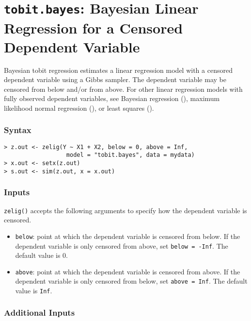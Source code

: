 \section{\texttt{tobit.bayes}: Bayesian Linear Regression for a
Censored Dependent Variable} \label{tobit.bayes}

Bayesian tobit regression estimates a linear regression model with a
censored dependent variable using a Gibbs sampler.  The dependent
variable may be censored from below and/or from above.  For other
linear regression models with fully observed dependent variables, see
Bayesian regression (), maximum likelihood normal
regression (), or least squares ().

\subsubsection{Syntax}
\begin{verbatim}
> z.out <- zelig(Y ~ X1 + X2, below = 0, above = Inf, 
                  model = "tobit.bayes", data = mydata)
> x.out <- setx(z.out)
> s.out <- sim(z.out, x = x.out)
\end{verbatim}

\subsubsection{Inputs}
{\tt zelig()} accepts the following arguments to specify how the
dependent variable is censored.
\begin{itemize}
\item \texttt{below}: point at which the dependent variable is censored
from below. If the dependent variable is only censored from above, set 
\texttt{below = -Inf}. The default value is 0.
\item \texttt{above}: point at which the dependent variable is censored
from above. If the dependent variable is only censored from below, set 
\texttt{above = Inf}. The default value is \texttt{Inf}.
\end{itemize}

\subsubsection{Additional Inputs}

